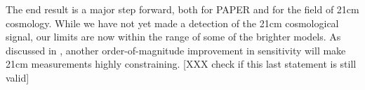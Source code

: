 \documentclass[twocolumn,numberedappendix]{emulateapj} \shorttitle{New Limits on the 21 cm Power Spectrum at $z=8.4$}
\begin{document}
The end result is a major step forward, both for PAPER and for the field of 21cm cosmology.
While we have not yet made a detection of the 21cm cosmological signal, our limits are
now within the range of some of the brighter models.  As discussed in \citet{pober_et_al2015},
another order-of-magnitude improvement in sensitivity will make 21cm measurements highly constraining.
[XXX check if this last statement is still valid]



%
%
%
\end{document}
